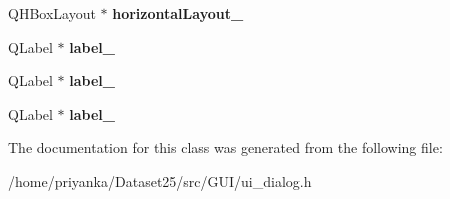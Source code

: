 \begin{DoxyCompactItemize}
\item 
\hypertarget{classUi__Dialog_ab23bf4588fc8ad303dc922ef54138d15}{\-Q\-H\-Box\-Layout $\ast$ {\bfseries horizontal\-Layout\-\_}}\label{classUi__Dialog_ab23bf4588fc8ad303dc922ef54138d15}

\item 
\hypertarget{classUi__Dialog_a18eabf425290cd39fd1dd7d830e05483}{\-Q\-Label $\ast$ {\bfseries label\-\_}}\label{classUi__Dialog_a18eabf425290cd39fd1dd7d830e05483}

\item 
\hypertarget{classUi__Dialog_ae82e33818032289eb9378e59865cc0ce}{\-Q\-Label $\ast$ {\bfseries label\-\_}}\label{classUi__Dialog_ae82e33818032289eb9378e59865cc0ce}

\item 
\hypertarget{classUi__Dialog_a7d85a9b6ac4febdb882d4863a040d928}{\-Q\-Label $\ast$ {\bfseries label\-\_}}\label{classUi__Dialog_a7d85a9b6ac4febdb882d4863a040d928}

\end{DoxyCompactItemize}


\-The documentation for this class was generated from the following file\-:\begin{DoxyCompactItemize}
\item 
/home/priyanka/\-Dataset25/src/\-G\-U\-I/ui\-\_\-dialog.\-h\end{DoxyCompactItemize}
